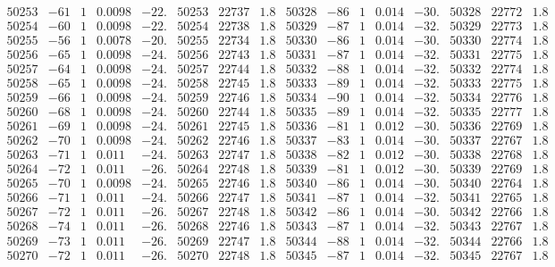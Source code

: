 \documentclass[11pt,reqno,a4letter]{article}
\numberwithin{figure}{section}
\numberwithin{table}{section}
\theoremstyle{plain}
\numberwithin{theorem}{section}
\theoremstyle{definition}
\begin{document}
\begin{table}[ht]
\begin{equation*}
{\begin{array}{ccccc|ccc||ccccc|ccc}
50253 & -61 & 1 & 0.0098 & -22. & 50253 & 22737 & 1.8 & 50328 & -86 & 1 & 0.014 & -30. & 50328 & 22772 & 1.8  \\
50254 & -60 & 1 & 0.0098 & -22. & 50254 & 22738 & 1.8 & 50329 & -87 & 1 & 0.014 & -32. & 50329 & 22773 & 1.8  \\
50255 & -56 & 1 & 0.0078 & -20. & 50255 & 22734 & 1.8 & 50330 & -86 & 1 & 0.014 & -30. & 50330 & 22774 & 1.8  \\
50256 & -65 & 1 & 0.0098 & -24. & 50256 & 22743 & 1.8 & 50331 & -87 & 1 & 0.014 & -32. & 50331 & 22775 & 1.8  \\
50257 & -64 & 1 & 0.0098 & -24. & 50257 & 22744 & 1.8 & 50332 & -88 & 1 & 0.014 & -32. & 50332 & 22774 & 1.8  \\
50258 & -65 & 1 & 0.0098 & -24. & 50258 & 22745 & 1.8 & 50333 & -89 & 1 & 0.014 & -32. & 50333 & 22775 & 1.8  \\
50259 & -66 & 1 & 0.0098 & -24. & 50259 & 22746 & 1.8 & 50334 & -90 & 1 & 0.014 & -32. & 50334 & 22776 & 1.8  \\
50260 & -68 & 1 & 0.0098 & -24. & 50260 & 22744 & 1.8 & 50335 & -89 & 1 & 0.014 & -32. & 50335 & 22777 & 1.8  \\
50261 & -69 & 1 & 0.0098 & -24. & 50261 & 22745 & 1.8 & 50336 & -81 & 1 & 0.012 & -30. & 50336 & 22769 & 1.8  \\
50262 & -70 & 1 & 0.0098 & -24. & 50262 & 22746 & 1.8 & 50337 & -83 & 1 & 0.014 & -30. & 50337 & 22767 & 1.8  \\
50263 & -71 & 1 & 0.011 & -24. & 50263 & 22747 & 1.8 & 50338 & -82 & 1 & 0.012 & -30. & 50338 & 22768 & 1.8  \\
50264 & -72 & 1 & 0.011 & -26. & 50264 & 22748 & 1.8 & 50339 & -81 & 1 & 0.012 & -30. & 50339 & 22769 & 1.8  \\
50265 & -70 & 1 & 0.0098 & -24. & 50265 & 22746 & 1.8 & 50340 & -86 & 1 & 0.014 & -30. & 50340 & 22764 & 1.8  \\
50266 & -71 & 1 & 0.011 & -24. & 50266 & 22747 & 1.8 & 50341 & -87 & 1 & 0.014 & -32. & 50341 & 22765 & 1.8  \\
50267 & -72 & 1 & 0.011 & -26. & 50267 & 22748 & 1.8 & 50342 & -86 & 1 & 0.014 & -30. & 50342 & 22766 & 1.8  \\
50268 & -74 & 1 & 0.011 & -26. & 50268 & 22746 & 1.8 & 50343 & -87 & 1 & 0.014 & -32. & 50343 & 22767 & 1.8  \\
50269 & -73 & 1 & 0.011 & -26. & 50269 & 22747 & 1.8 & 50344 & -88 & 1 & 0.014 & -32. & 50344 & 22766 & 1.8  \\
50270 & -72 & 1 & 0.011 & -26. & 50270 & 22748 & 1.8 & 50345 & -87 & 1 & 0.014 & -32. & 50345 & 22767 & 1.8  \\

\end{array}}
\end{equation*}
\end{table}
\end{document}
